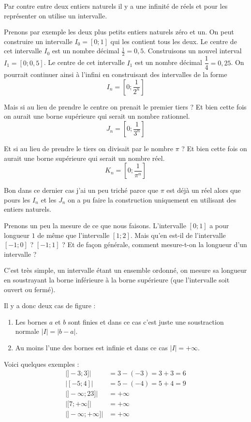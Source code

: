 \documentclass[a4paper, 11pt, twoside]{book}
\begin{document}
Par contre entre deux entiers naturels il y a une infinité de réels
et pour les représenter on utilise un intervalle.

Prenons par exemple les deux plus petits entiers naturels zéro et
un. On peut construire un intervalle \(I_0 = [0 ; 1]\) qui les contient
tous les deux. Le centre de cet intervalle \(I_0\) est un nombre décimal
\(\frac{1}{2} = 0,5\). Construisons un nouvel interval \(I_1 = [0;
   0,5]\). Le centre de cet intervalle \(I_1\) est un nombre décimal
\(\dfrac{1}{4} = 0,25\). On pourrait continuer ainsi à l'infini en
construisant des intervalles de la forme \[I_n = \left[0 ;
   \dfrac{1}{2^n}\right]\]

Mais si au lieu de prendre le centre on prenait le premier tiers ?
Et bien cette fois on aurait une borne supérieure qui serait un
nombre rationnel. \[J_n = \left[0 ; \dfrac{1}{3^n}\right]\]

Et si au lieu de prendre le tiers on divisait par le nombre \(\pi\) ?
Et bien cette fois on aurait une borne supérieure qui serait un
nombre réel. \[K_n = \left[0 ; \dfrac{1}{\pi^n}\right]\]

Bon dans ce dernier cas j'ai un peu triché parce que \(\pi\) est déjà
un réel alors que pours les \(I_n\) et les \(J_n\) on a pu faire la
construction uniquement en utilisant des entiers naturels.

Prenons un peu la mesure de ce que nous faisons. L'intervalle \([0 ;
   1]\) a pour longueur \(1\) de même que l'intervalle \([1 ; 2]\). Mais
qu'en est-il de l'intervalle \([-1 ; 0]\) ? \([-1 ; 1]\) ? Et de façon
générale, comment mesure-t-on la longueur d'un intervalle ?

C'est très simple, un intervalle étant un ensemble ordonné, on
mesure sa longueur en soustrayant la borne inférieure à la borne
supérieure (que l'intervalle soit ouvert ou fermé).

Il y a donc deux cas de figure :
\begin{enumerate}
\item Les bornes \(a\) et \(b\) sont finies et dans ce cas c'est juste une
soustraction normale \(|I| = |b - a|\).
\item Au moins l'une des bornes est infinie et dans ce cas \(|I| =
      +\infty\).
\end{enumerate}

Voici quelques exemples :
\begin{align*}
\lvert ]-3 ; 3] \rvert &= 3 - (-3) = 3 + 3 = 6\\
\lvert [-5 ; 4] \rvert &= 5 - (-4) = 5 + 4 = 9\\
\lvert ]-\infty ; 23] \rvert &= +\infty\\
\lvert [7 ; +\infty[ \rvert &= +\infty\\
\lvert ]-\infty ; +\infty] \rvert &= +\infty
\end{align*}
\end{document}
